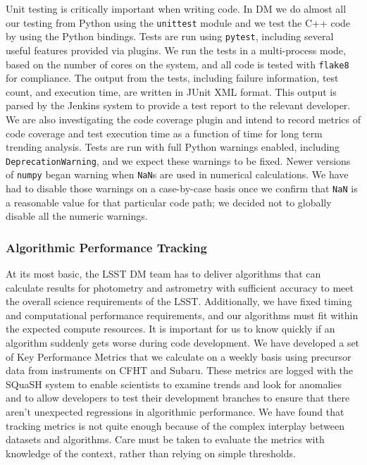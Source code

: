Unit testing is critically important when writing code.
In DM we do almost all our testing from Python using the \texttt{unittest} module and we test the C++ code by using the Python bindings.
Tests are run using \texttt{pytest}\cite{pytest}, including several useful features provided via plugins.
We run the tests in a multi-process mode, based on the number of cores on the system, and all code is tested with \texttt{flake8} for compliance.
The output from the tests, including failure information, test count, and execution time, are written in JUnit XML format.  This output is parsed by the Jenkins system to provide a test report to the relevant developer.
We are also investigating the code coverage plugin and intend to record metrics of code coverage and test execution time as a function of time for long term trending analysis.
Tests are run with full Python warnings enabled, including \texttt{DeprecationWarning}, and we expect these warnings to be fixed.
Newer versions of \texttt{numpy} began warning when \texttt{NaN}s are used in numerical calculations. We have had to disable those warnings on a case-by-case basis once we confirm that \texttt{NaN} is a reasonable value for that particular code path; we decided not to globally disable all the numeric warnings.

\subsubsection{Algorithmic Performance Tracking}

At its most basic, the LSST DM team has to deliver algorithms that can calculate results for photometry and astrometry with sufficient accuracy to meet the overall science requirements of the LSST\cite{LPM-17}.
Additionally, we have fixed timing and computational performance requirements, and our algorithms must fit within the expected compute resources.
It is important for us to know quickly if an algorithm suddenly gets worse during code development.
We have developed a set of Key Performance Metrics that we calculate on a weekly basis using precursor data from instruments on CFHT and Subaru.
These metrics are logged with the SQuaSH system\cite{SQR-009} to enable scientists to examine trends and look for anomalies and to allow developers to test their development branches to ensure that there aren't unexpected regressions in algorithmic performance.
We have found that tracking metrics is not quite enough because of the complex interplay between datasets and algorithms.
Care must be taken to evaluate the metrics with knowledge of the context, rather than relying on simple thresholds.

